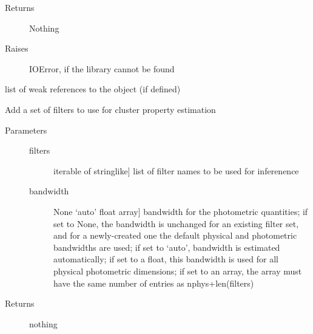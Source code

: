 \documentclass[letterpaper,10pt,english]{sphinxmanual}
\begin{document}
\begin{fulllineitems}
\begin{fulllineitems}
\begin{description}
\begin{description}
\end{description}

\item[{Returns}] \leavevmode
Nothing

\item[{Raises}] \leavevmode
IOError, if the library cannot be found

\end{description}

\end{fulllineitems}


\begin{fulllineitems}
\label{cluster_slug:slugpy.cluster_slug.cluster_slug.__weakref__}
list of weak references to the object (if defined)

\end{fulllineitems}


\begin{fulllineitems}
\label{cluster_slug:slugpy.cluster_slug.cluster_slug.add_filters}
Add a set of filters to use for cluster property estimation
\begin{description}
\item[{Parameters}] \leavevmode\begin{description}
\item[{filters}] \leavevmode{[}iterable of stringlike{]}
list of filter names to be used for inferenence

\item[{bandwidth}] \leavevmode{[}None \textbar{} `auto' \textbar{} float \textbar{} array{]}
bandwidth for the photometric quantities; if set to
None, the bandwidth is unchanged for an existing filter
set, and for a newly-created one the default physical
and photometric bandwidths are used; if set to `auto',
bandwidth is estimated automatically; if set to a float,
this bandwidth is used for all physical photometric
dimensions; if set to an array, the array must have the
same number of entries as nphys+len(filters)

\end{description}

\item[{Returns}] \leavevmode
nothing


\end{description}
\end{fulllineitems}
\end{fulllineitems}
\end{document}
